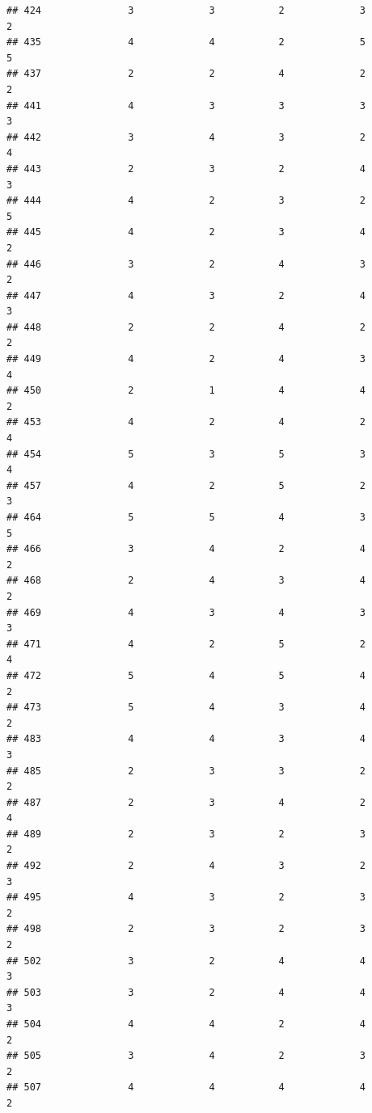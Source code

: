 \documentclass[
]{article}
\begin{document}
\begin{verbatim}
## 424               3             3           2             3            2
## 435               4             4           2             5            5
## 437               2             2           4             2            2
## 441               4             3           3             3            3
## 442               3             4           3             2            4
## 443               2             3           2             4            3
## 444               4             2           3             2            5
## 445               4             2           3             4            2
## 446               3             2           4             3            2
## 447               4             3           2             4            3
## 448               2             2           4             2            2
## 449               4             2           4             3            4
## 450               2             1           4             4            2
## 453               4             2           4             2            4
## 454               5             3           5             3            4
## 457               4             2           5             2            3
## 464               5             5           4             3            5
## 466               3             4           2             4            2
## 468               2             4           3             4            2
## 469               4             3           4             3            3
## 471               4             2           5             2            4
## 472               5             4           5             4            2
## 473               5             4           3             4            2
## 483               4             4           3             4            3
## 485               2             3           3             2            2
## 487               2             3           4             2            4
## 489               2             3           2             3            2
## 492               2             4           3             2            3
## 495               4             3           2             3            2
## 498               2             3           2             3            2
## 502               3             2           4             4            3
## 503               3             2           4             4            3
## 504               4             4           2             4            2
## 505               3             4           2             3            2
## 507               4             4           4             4            2

\end{verbatim}
\end{document}
